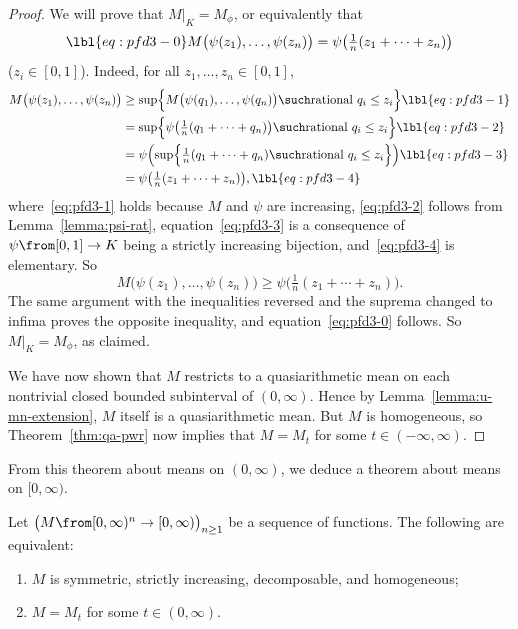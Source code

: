 \begin{proof}
We will prove that $M|_K = M_{\phi}$, or equivalently that 
% 
\begin{equation}
\lbl{eq:pfd3-0}
M\bigl(
\psi(z_1), \ldots, \psi(z_n)
\bigr)
=
\psi\bigl(
\tfrac{1}{n} (z_1 + \cdots + z_n)
\bigr)
\end{equation}
% 
($z_i \in [0, 1]$).  Indeed, for all $z_1, \ldots, z_n \in [0, 1]$,
% 
\begin{align}
M\bigl(
\psi(z_1), \ldots, \psi(z_n)
\bigr)  
&
\geq
\sup \Bigl\{
M\bigl(
\psi(q_1), \ldots, \psi(q_n)
\bigr)  \such
\text{rational } q_i \leq z_i
\Bigr\} 
\lbl{eq:pfd3-1}       \\
&
=
\sup \Bigl\{
\psi \bigl( \tfrac{1}{n} (q_1 + \cdots + q_n) \bigr)
\such
\text{rational } q_i \leq z_i
\Bigr\} 
\lbl{eq:pfd3-2}       \\
&
=
\psi \Bigl( 
\sup \Bigl\{
\tfrac{1}{n} (q_1 + \cdots + q_n)
\such
\text{rational } q_i \leq z_i
\Bigr\}
\Bigr)
\lbl{eq:pfd3-3}       \\
&
=
\psi\bigl(
\tfrac{1}{n} (z_1 + \cdots + z_n)
\bigr),
\lbl{eq:pfd3-4}
\end{align}
% 
where~\eqref{eq:pfd3-1} holds because $M$ and $\psi$ are increasing,
\eqref{eq:pfd3-2} follows from
Lemma~\ref{lemma:psi-rat}, equation~\eqref{eq:pfd3-3}
is a consequence of $\psi \from [0, 1] \to K$ being a strictly increasing
bijection, and~\eqref{eq:pfd3-4} is elementary.  So
\[
M \bigl( \psi(z_1), \ldots, \psi(z_n) \bigr)
\geq
\psi \bigl( \tfrac{1}{n} (z_1 + \cdots + z_n) \bigr).
\]
The same argument with the inequalities reversed and the suprema changed to
infima proves the opposite inequality, and equation~\eqref{eq:pfd3-0}
follows.  So $M|_K = M_\phi$, as claimed.

We have now shown that $M$ restricts to a quasiarithmetic mean on each
nontrivial closed bounded subinterval of $(0, \infty)$.  Hence by
Lemma~\ref{lemma:u-mn-extension}, $M$ itself is a quasiarithmetic mean.
But $M$ is homogeneous, so Theorem~\ref{thm:qa-pwr} now implies that $M =
M_t$ for some $t \in (-\infty, \infty)$.
\end{proof}

From this theorem about means on $(0, \infty)$, we deduce a 
theorem about means on $[0, \infty)$.

\begin{thm}
\index{power mean!characterization of!unweighted on $[0, \infty)$}
% 
Let $\bigl( M \from [0, \infty)^n \to [0, \infty) \bigr)_{n \geq 1}$ be a
sequence of functions.  The following are equivalent:
% 
\begin{enumerate}
\item 
{}
$M$ is symmetric, strictly increasing, decomposable, and homogeneous;

\item
{}
$M = M_t$ for some $t \in (0, \infty)$.
\end{enumerate}
\end{thm}

